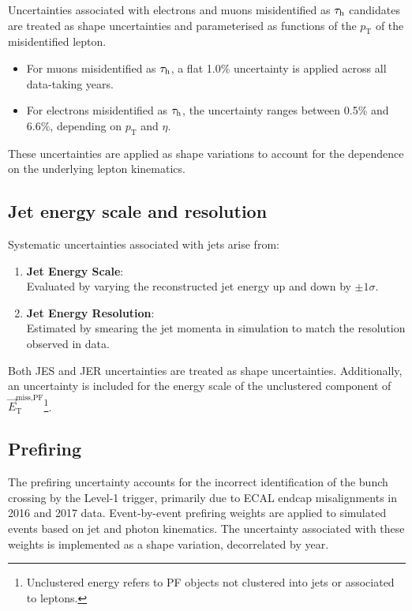 Uncertainties associated with electrons and muons misidentified as $\tau_\mathrm{h}$ candidates are treated as shape uncertainties and parameterised as functions of the $p_{\mathrm{T}}$ of the misidentified lepton. 

\begin{itemize}
    \item For muons misidentified as $\tau_\mathrm{h}$, a flat 1.0\% uncertainty is applied across all data-taking years.
    \item For electrons misidentified as $\tau_\mathrm{h}$, the uncertainty ranges between 0.5\% and 6.6\%, depending on $p_{\mathrm{T}}$ and $\eta$.
\end{itemize}

These uncertainties are applied as shape variations to account for the dependence on the underlying lepton kinematics.

\subsection{Jet energy scale and resolution}

Systematic uncertainties associated with jets arise from:
\begin{enumerate}[label=(\roman*)]

\item \textbf{Jet Energy Scale}: \\
Evaluated by varying the reconstructed jet energy up and down by $\pm1\sigma$.

\item \textbf{Jet Energy Resolution}: \\
Estimated by smearing the jet momenta in simulation to match the resolution observed in data.

\end{enumerate}

Both JES and JER uncertainties are treated as shape uncertainties. Additionally, an uncertainty is included for the energy scale of the unclustered component of $\vec{E}_\mathrm{T}^{\text{miss,PF}}$\footnote{Unclustered energy refers to PF objects not clustered into jets or associated to leptons.}.

\subsection{Prefiring}
The prefiring uncertainty accounts for the incorrect identification of the bunch crossing by the Level-1 trigger, primarily due to ECAL endcap misalignments in 2016 and 2017 data. Event-by-event prefiring weights are applied to simulated events based on jet and photon kinematics. The uncertainty associated with these weights is implemented as a shape variation, decorrelated by year.

